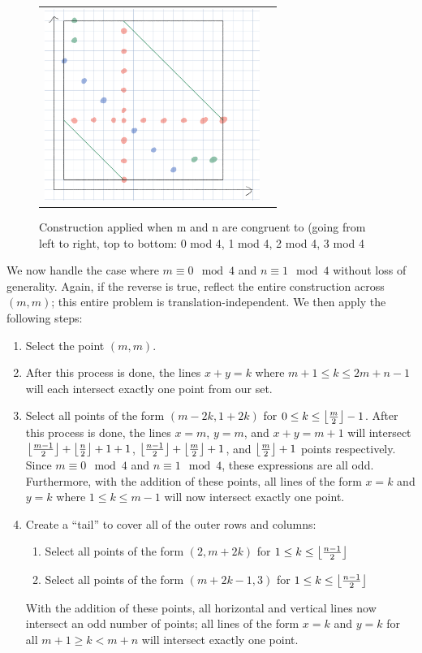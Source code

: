 \documentclass[10pt]{../usamts}
\begin{document}
\begin{solution}
\begin{figure}[htbp]
\begin{tabular}{c c}
    \includegraphics[width=7cm]{round2/p5construct/construct_7_11.png}\\
    \end{tabular}
    \caption{Construction applied when m and n are congruent to (going from left to right, top to bottom: 0 mod 4, 1 mod 4, 2 mod 4, 3 mod 4}
    \label{fig:congconstruct}
\end{figure}

\clearpage
We now handle the case where $m \equiv 0 \mod 4$ and $n \equiv 1 \mod 4$ without loss of generality. Again, if the reverse is true, reflect the entire construction across $(m,m)$; this entire problem is translation-independent. We then apply the following steps:

\begin{enumerate}
    \item Select the point $(m,m)$.
    \item \mainaxis
    After this process is done, the lines $x+y = k$ where $m+1 \leq k \leq 2m+n-1$ will each intersect exactly one point from our set.
    \item Select all points of the form $(m-2k, 1+2k)$ for $0 \leq k \leq \left\lfloor \frac{m}{2} \right\rfloor-1$.
    After this process is done, the lines $x=m$, $y=m$, and $x+y = m+1$ will intersect $\left\lfloor \frac{m-1}{2} \right\rfloor + \left\lfloor \frac{n}{2} \right\rfloor + 1 + 1$, $\left\lfloor \frac{n-1}{2} \right\rfloor + \left\lfloor \frac{m}{2} \right\rfloor + 1$, and $\left\lfloor \frac{m}{2} \right\rfloor + 1$ points respectively. Since $m \equiv 0 \mod 4$ and $n \equiv 1 \mod 4$, these expressions are all odd. Furthermore, with the addition of these points, all lines of the form $x=k$ and $y=k$ where $1 \leq k \leq m-1$ will now intersect exactly one point.
    \item Create a ``tail'' to cover all of the outer rows and columns:
    \begin{enumerate}
        \item Select all points of the form $(2, m+2k)$ for $1 \leq k \leq \left\lfloor \frac{n-1}{2} \right\rfloor$
        \item Select all points of the form $(m+2k-1, 3)$ for $1 \leq k \leq \left\lfloor \frac{n-1}{2} \right\rfloor$
    \end{enumerate}
    With the addition of these points, all horizontal and vertical lines now intersect an odd number of points; all lines of the form $x = k$ and $y=k$ for all $m+1 \geq k < m+n$ will intersect exactly one point.
    

\end{enumerate}
\end{solution}
\end{document}
